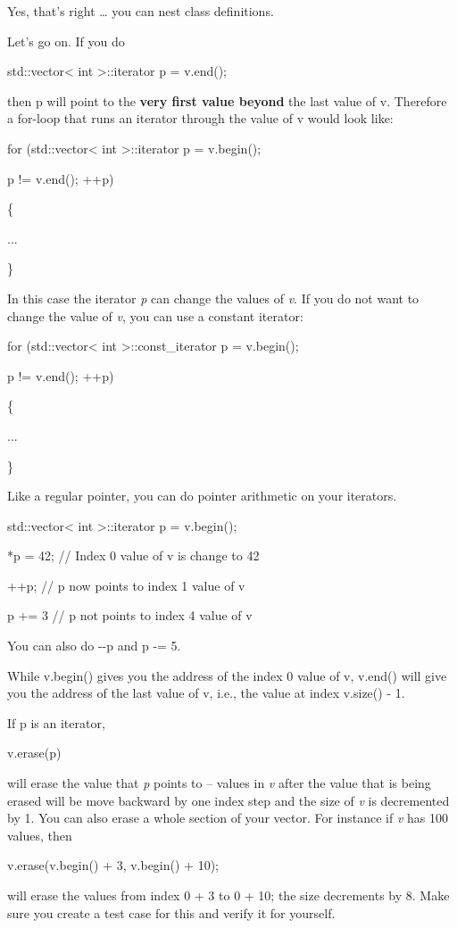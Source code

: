 \documentclass[
]{article}
\begin{document}
Yes, that's right \ldots{} you can nest class definitions.

Let's go on. If you do

std::vector\textless{} int \textgreater::iterator p = v.end();

then p will point to the \textbf{very first value beyond} the last value
of v. Therefore a for-loop that runs an iterator through the value of v
would look like:

for (std::vector\textless{} int \textgreater::iterator p = v.begin();

p != v.end(); ++p)

\{

...

\}

In this case the iterator \emph{p} can change the values of \emph{v}. If
you do not want to change the value of \emph{v}, you can use a constant
iterator:

for (std::vector\textless{} int \textgreater::const\_iterator p =
v.begin();

p != v.end(); ++p)

\{

...

\}

Like a regular pointer, you can do pointer arithmetic on your iterators.

std::vector\textless{} int \textgreater::iterator p = v.begin();

*p = 42; // Index 0 value of v is change to 42

++p; // p now points to index 1 value of v

p += 3 // p not points to index 4 value of v

You can also do -\/-p and p -= 5.

While v.begin() gives you the address of the index 0 value of v, v.end()
will give you the address of the last value of v, i.e., the value at
index v.size() - 1.

If p is an iterator,

v.erase(p)

will erase the value that \emph{p} points to -- values in \emph{v} after
the value that is being erased will be move backward by one index step
and the size of \emph{v} is decremented by 1. You can also erase a whole
section of your vector. For instance if \emph{v} has 100 values, then

v.erase(v.begin() + 3, v.begin() + 10);

will erase the values from index 0 + 3 to 0 + 10; the size decrements by
8. Make sure you create a test case for this and verify it for yourself.
\end{document}

